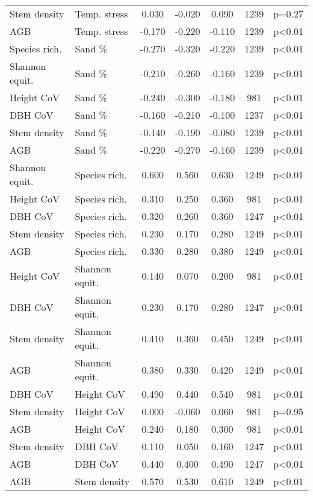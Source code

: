 \begin{longtable}{llSSSS[table-format=3.2,table-column-width=0.8cm]c}
Stem density & Temp. stress & 0.030 & -0.020 & 0.090 & 1239 & p=0.27 \\ 
AGB & Temp. stress & -0.170 & -0.220 & -0.110 & 1239 & p<0.01 \\ 
Species rich. & Sand \% & -0.270 & -0.320 & -0.220 & 1239 & p<0.01 \\ 
Shannon equit. & Sand \% & -0.210 & -0.260 & -0.160 & 1239 & p<0.01 \\ 
Height CoV & Sand \% & -0.240 & -0.300 & -0.180 & 981 & p<0.01 \\ 
DBH CoV & Sand \% & -0.160 & -0.210 & -0.100 & 1237 & p<0.01 \\ 
Stem density & Sand \% & -0.140 & -0.190 & -0.080 & 1239 & p<0.01 \\ 
AGB & Sand \% & -0.220 & -0.270 & -0.160 & 1239 & p<0.01 \\ 
Shannon equit. & Species rich. & 0.600 & 0.560 & 0.630 & 1249 & p<0.01 \\ 
Height CoV & Species rich. & 0.310 & 0.250 & 0.360 & 981 & p<0.01 \\ 
DBH CoV & Species rich. & 0.320 & 0.260 & 0.360 & 1247 & p<0.01 \\ 
Stem density & Species rich. & 0.230 & 0.170 & 0.280 & 1249 & p<0.01 \\ 
AGB & Species rich. & 0.330 & 0.280 & 0.380 & 1249 & p<0.01 \\ 
Height CoV & Shannon equit. & 0.140 & 0.070 & 0.200 & 981 & p<0.01 \\ 
DBH CoV & Shannon equit. & 0.230 & 0.170 & 0.280 & 1247 & p<0.01 \\ 
Stem density & Shannon equit. & 0.410 & 0.360 & 0.450 & 1249 & p<0.01 \\ 
AGB & Shannon equit. & 0.380 & 0.330 & 0.420 & 1249 & p<0.01 \\ 
DBH CoV & Height CoV & 0.490 & 0.440 & 0.540 & 981 & p<0.01 \\ 
Stem density & Height CoV & 0.000 & -0.060 & 0.060 & 981 & p=0.95 \\ 
AGB & Height CoV & 0.240 & 0.180 & 0.300 & 981 & p<0.01 \\ 
Stem density & DBH CoV & 0.110 & 0.050 & 0.160 & 1247 & p<0.01 \\ 
AGB & DBH CoV & 0.440 & 0.400 & 0.490 & 1247 & p<0.01 \\ 
AGB & Stem density & 0.570 & 0.530 & 0.610 & 1249 & p<0.01 \\ 
\bottomrule
\end{longtable}
